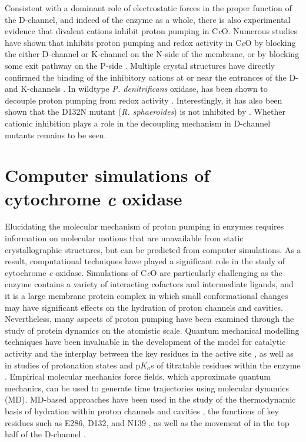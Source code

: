 Consistent with a dominant role of electrostatic forces in the proper function of the D-channel, and indeed of the enzyme as a whole, there is also experimental evidence that divalent cations inhibit proton pumping in C\emph{c}O. Numerous studies have shown that  inhibits proton pumping and redox activity in C\emph{c}O by blocking the either D-channel or K-channel on the N-side of the membrane, or by blocking some exit pathway on the P-side \cite{Kannt:2001p8408,Aagaard:2002p8410,Kuznetsova:2005p8380,Faxen:2006p8398,Francia:2007p8388,Qin:2007p8387,Muramoto:2007p8383,Vygodina:2008p8389}. Multiple crystal structures have directly confirmed the binding of the inhibitory cations at or near the entrances of the D- and K-channels \cite{Qin:2007p8387,Muramoto:2007p8383}. In wildtype \emph{P. denitrificans} oxidase,  has been shown to decouple proton pumping from redox activity \cite{Kannt:2001p8408}. Interestingly, it has also been shown that the D132N mutant (\emph{R. sphaeroides}) is not inhibited by  \cite{Aagaard:2002p8410}. Whether cationic inhibition plays a role in the decoupling mechanism in D-channel mutants remains to be seen.

\section{Computer simulations of cytochrome \emph{c} oxidase}

Elucidating the molecular mechanism of proton pumping in enzymes requires information on molecular motions that are unavailable from static crystallographic structures, but can be predicted from computer simulations. As a result, computational techniques have played a significant role in the study of cytochrome \emph{c} oxidase. Simulations of C\emph{c}O are particularly challenging as the enzyme contains a variety of interacting cofactors and intermediate ligands, and it is a large membrane protein complex in which small conformational changes may have significant effects on the hydration of proton channels and cavities. Nevertheless, many aspects of proton pumping have been examined through the study of protein dynamics on the atomistic scale. Quantum mechanical modelling techniques have been invaluable in the development of the model for catalytic activity and the interplay between the key residues in the active site \cite{Fadda:2008p5482,Johansson:2008p5653,Xie:2008p8091,Lee:2009p8180,Kamiya:2011p10246}, as well as in studies of protonation states and p$K_a$s of titratable residues within the enzyme \cite{Quenneville:2006p5306,Fadda:2008p5482,Leontyev:2009p9842}. Empirical molecular mechanics force fields, which approximate quantum mechanics, can be used to generate time trajectories using molecular dynamics (MD). MD-based approaches have been used in the study of the thermodynamic basis of hydration within proton channels and cavities \cite{Olkhova:2004p6851,Tashiro:2005p7174,Sugitani:2009p5715,Henry:2009p4543}, the functions of key residues such as E286, D132, and N139 \cite{Ghosh:2009p10110,Kaila:2009p6199,Henry:2009p4543}, as well as the movement of  in the top half of the D-channel \cite{Xu:2005p9841,Xu:2008p9867}.

